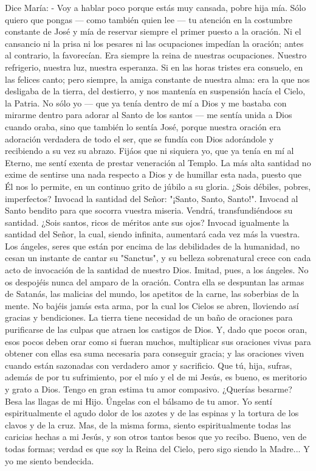 \documentclass[12pt]{book} %
\begin{document}
Dice María:                         
- Voy a hablar poco porque estás muy cansada, pobre hija mía. Sólo quiero que pongas — como también quien lee — tu 
atención en la costumbre constante de José y mía de reservar siempre el primer puesto a la oración. Ni el cansancio ni la prisa ni los pesares ni las ocupaciones impedían la oración; antes al contrario, la favorecían. 
Era siempre la reina de nuestras ocupaciones. Nuestro refrigerio, nuestra luz, nuestra esperanza. Si en las horas tristes 
era consuelo, en las felices canto; pero siempre, la amiga constante de nuestra alma: era la que nos desligaba de la tierra, del destierro, y nos mantenía en suspensión hacía el Cielo, la Patria. 
No sólo yo — que ya tenía dentro de mí a Dios y me bastaba con mirarme dentro para adorar al Santo de los santos — me sentía unida a Dios cuando oraba, sino que también lo sentía José, porque nuestra oración era adoración verdadera de todo el ser, que se fundía con Dios adorándole y recibiendo a su vez su abrazo.       
Fijáos que ni siquiera yo, que ya tenía en mí al Eterno, me sentí exenta de prestar veneración al Templo. La más alta santidad no exime de sentirse una nada respecto a Dios y de humillar esta nada, puesto que Él nos lo permite, en un continuo grito de júbilo a su gloria.                              
¿Sois débiles, pobres, imperfectos? Invocad la santidad del Señor: "¡Santo, Santo, Santo!". Invocad al Santo bendito 
para que socorra vuestra miseria. Vendrá, transfundiéndoos su santidad. ¿Sois santos, ricos de méritos ante sus ojos? Invocad igualmente la santidad del Señor, la cual, siendo infinita, aumentará cada vez más la  vuestra. Los ángeles, seres que están por encima de las debilidades de la humanidad, no cesan un instante de cantar su "Sanctus", y su belleza sobrenatural crece con cada acto de invocación de la santidad de nuestro Dios. Imitad, pues, a los ángeles. 
No os despojéis nunca del amparo de la oración. Contra ella se despuntan las armas de Satanás, las malicias del mundo, 
los apetitos de la carne, las soberbias de la mente. No bajéis jamás esta arma, por la cual los Cielos se abren, lloviendo así gracias y bendiciones. 
La tierra tiene necesidad de un baño de oraciones para purificarse de las culpas que atraen los castigos de Dios. Y, dado que pocos oran, esos pocos deben orar como si fueran muchos, multiplicar sus oraciones vivas para obtener con ellas esa suma necesaria para conseguir gracia; y las oraciones viven cuando están sazonadas con verdadero amor y sacrificio. 
Que tú, hija, sufras, además de por tu sufrimiento, por el mío y el de mi Jesús, es bueno, es meritorio y grato a Dios. Tengo en gran estima tu amor compasivo. ¿Querías besarme? Besa las llagas de mi Hijo. Úngelas con el bálsamo de tu amor. Yo sentí espiritualmente el agudo dolor de los azotes y de las espinas y la tortura de los clavos y de la cruz. Mas, de la misma forma, siento espiritualmente todas las caricias hechas a mi Jesús, y son otros tantos besos que yo recibo. Bueno, ven de todas formas; verdad es que soy la Reina del Cielo, pero sigo siendo la Madre... Y yo me siento bendecida. 
 
\end{document}
